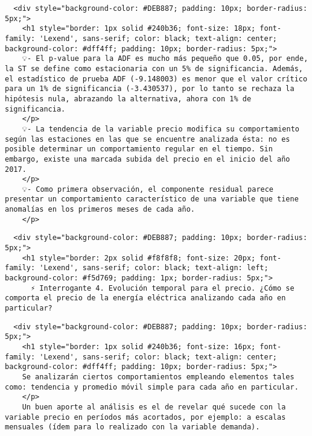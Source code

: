 \documentclass[11pt]{article}
\begin{document}
    \begin{verbatim}
  <div style="background-color: #DEB887; padding: 10px; border-radius: 5px;">
    <h1 style="border: 1px solid #240b36; font-size: 18px; font-family: 'Lexend', sans-serif; color: black; text-align: center; background-color: #dff4ff; padding: 10px; border-radius: 5px;">
    💡- El p-value para la ADF es mucho más pequeño que 0.05, por ende, la ST se define como estacionaria con un 5% de significancia. Además, el estadístico de prueba ADF (-9.148003) es menor que el valor crítico para un 1% de significancia (-3.430537), por lo tanto se rechaza la hipótesis nula, abrazando la alternativa, ahora con 1% de significancia.
    </p>
    💡- La tendencia de la variable precio modifica su comportamiento según las estaciones en las que se encuentre analizada ésta: no es posible determinar un comportamiento regular en el tiempo. Sin embargo, existe una marcada subida del precio en el inicio del año 2017.
    </p>
    💡- Como primera observación, el componente residual parece presentar un comportamiento característico de una variable que tiene anomalías en los primeros meses de cada año.
    </p>
\end{verbatim}

    \begin{verbatim}
  <div style="background-color: #DEB887; padding: 10px; border-radius: 5px;">
    <h1 style="border: 2px solid #f8f8f8; font-size: 20px; font-family: 'Lexend', sans-serif; color: black; text-align: left; background-color: #f5d769; padding: 1px; border-radius: 5px;">
      ⚡ Interrogante 4. Evolución temporal para el precio. ¿Cómo se comporta el precio de la energía eléctrica analizando cada año en particular?          
\end{verbatim}

    \begin{verbatim}
  <div style="background-color: #DEB887; padding: 10px; border-radius: 5px;">
    <h1 style="border: 1px solid #240b36; font-size: 16px; font-family: 'Lexend', sans-serif; color: black; text-align: center; background-color: #dff4ff; padding: 10px; border-radius: 5px;">
    Se analizarán ciertos comportamientos empleando elementos tales como: tendencia y promedio móvil simple para cada año en particular.
    </p>
    Un buen aporte al análisis es el de revelar qué sucede con la variable precio en períodos más acortados, por ejemplo: a escalas mensuales (ídem para lo realizado con la variable demanda).
\end{verbatim}
\end{document}
